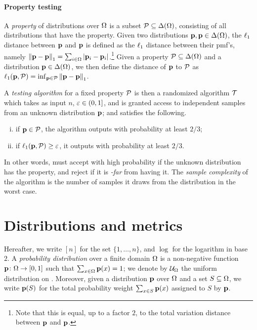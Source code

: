 \paragraph{Property testing}

A \emph{property} of distributions over $\domain[\Omega]$ is a subset $\property\subseteq \distribs{\domain[\Omega]}$, consisting of all distributions that have the property. Given two distributions $\p,\q\in\distribs{\domain[\Omega]}$, the $\lp[1]$ distance between $\p$ and $\q$ is defined as the $\lp[1]$ distance between their pmf's, namely $\normone{\p-\q} = \sum_{i\in\domain[\Omega]} \abs{\p_i-\q_i}$.\footnote{Note that this is equal, up to a factor $2$, to the total variation distance between $\p$ and $\q$.}{} Given a property $\property\subseteq \distribs{\domain[\Omega]}$ and a distribution $\p\in\distribs{\domain[\Omega]}$, we then define the distance of $\p$ to $\property$ as $\lp[1](\p,\property) = \inf_{\q\in\property} \normone{\p-\q}$.

A \emph{testing algorithm} for a fixed property $\property$ is then a randomized algorithm $\Tester$ which takes as input $n$, $\eps\in(0,1]$, and is granted access to independent samples from an unknown distribution $\p$; and satisfies the following.
\begin{enumerate}[(i)]
\item if $\p \in \property$, the algorithm outputs \accept with probability at least $2/3$;
\item if $\lp[1](\p,\property) \geq \eps$, it outputs \reject with probability at least $2/3$.
\end{enumerate}
In other words, \Tester must accept with high probability if the unknown distribution has the property, and reject if it is \emph{\eps-far} from having it. The  \emph{sample complexity} of the algorithm is the number of samples it draws from the distribution in the worst case.

\section{Distributions and metrics} 
Hereafter, we write $[n]$ for the set $\{1,\dots,n\}$, and $\log$ for the logarithm in base $2$. A \emph{probability distribution} over a finite domain $\domain$ is a non-negative function $\D\colon\domain\to[0,1]$ such that $\sum_{x\in\domain} \D(x) = 1$; we denote by $\uniform_{\domain}$ the uniform distribution on \domain. Moreover, given a distribution $\D$ over $\domain$ and a set $S\subseteq\domain$, we write $\D(S)$ for the total probability weight $\sum_{x\in S} \D(x)$ assigned to $S$ by $\D$.

